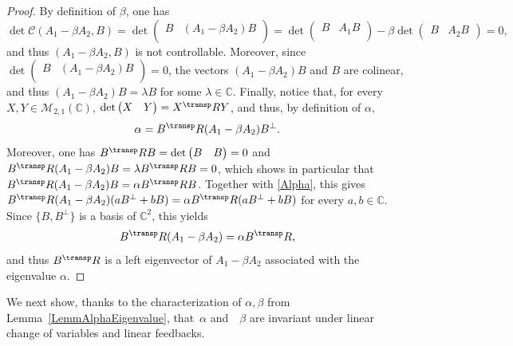 \begin{proof}
By definition of $\beta$, one has
\[\det\mathcal C(A_1 - \beta A_2, B) = \det\begin{pmatrix} B & (A_1 - \beta A_2) B\\\end{pmatrix} = \det\begin{pmatrix} B & A_1 B\\\end{pmatrix} - \beta \det\begin{pmatrix}B & A_2 B\end{pmatrix} = 0,\]
and thus $(A_1 - \beta A_2, B)$ is not controllable. Moreover, since $\det\begin{pmatrix} B & (A_1 - \beta A_2) B\\\end{pmatrix}  = 0$, the vectors $(A_1 - \beta A_2) B$ and $B$ are colinear, and thus $(A_1 - \beta A_2) B = \lambda B$ for some $\lambda \in \mathbb C$. Finally, notice that, for every $X, Y \in \mathcal M_{2, 1}(\mathbb C)$, $\det\begin{pmatrix}X & Y\\\end{pmatrix} = X^\transp R Y$, and thus, by definition of $\alpha$,
\begin{equation}
\label{Alpha}
\alpha = B^\transp R (A_1 - \beta A_2) B^\perp.
\end{equation}
Moreover, one has $B^\transp R B = \det\begin{pmatrix}B & B \\\end{pmatrix} = 0$ and $B^\transp R (A_1 - \beta A_2) B = \lambda B^\transp R B = 0$, which shows in particular that $B^\transp R (A_1 - \beta A_2) B = \alpha B^\transp R B$. Together with \eqref{Alpha}, this gives $B^\transp R (A_1 - \beta A_2) (a B^\perp  + b B) = \alpha B^\transp R (a B^\perp + b B)$ for every $a, b \in \mathbb C$. Since $\{B, B^\perp\}$ is a basis of $\mathbb C^2$, this yields
\[B^\transp R (A_1 - \beta A_2) = \alpha B^\transp R,\]
and thus $B^\transp R$ is a left eigenvector of $A_1 - \beta A_2$ associated with the eigenvalue $\alpha$.
\end{proof}

We next show, thanks to the characterization of $\alpha, \beta$ from Lemma~\ref{LemmAlphaEigenvalue}, that~$\alpha$ and~ $\beta$ are invariant under linear change of variables and linear feedbacks.

